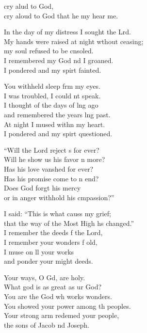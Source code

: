 \settowidth{\versewidth}{My hands were raised at night without ceasing; *}
\begin{psalmverse}%
  \begin{patverse}
     cry alud to God,\Med\\
cry aloud to God that he my hear me.

In the day of my distress I sought the Lrd.\Flex\\
My hands were raised at night w\pointup{\i}thout ceasing;\Med\\
my soul refused to be cnsoled.\\
I remembered my God nd I groaned.\Med\\
I pondered and my spir\pointup{\i}t fainted.

You withheld sleep frm my eyes.\Med\\
I was troubled, I could nt speak.\\
I thought of the days of lng ago\Med\\
and remembered the years lng past.\\
At night I mused with\pointup{\i}n my heart.\Med\\
I pondered and my spir\pointup{\i}t questioned.

“Will the Lord reject s for ever?\Med\\
Will he show us his favor n more?\\
Has his love van\pointup{\i}shed for ever?\Med\\
Has his promise come to n end?\\
Does God forgt his mercy\Med\\
or in anger withhold his cmpassion?”

I said: “This is what causs my grief;\Med\\
that the way of the Most High hs changed.”\\
I remember the deeds f the Lord,\Med\\
I remember your wonders f old,\\
I muse on ll your works\Med\\
and ponder your might deeds.

Your ways, O Gd, are holy.\Med\\
What god is as great as ur God?\\
You are the God wh works wonders.\Med\\
You showed your power among th peoples.\\
Your strong arm redemed your people,\Med\\
the sons of Jacob nd Joseph.


\end{patverse}
\end{psalmverse}
